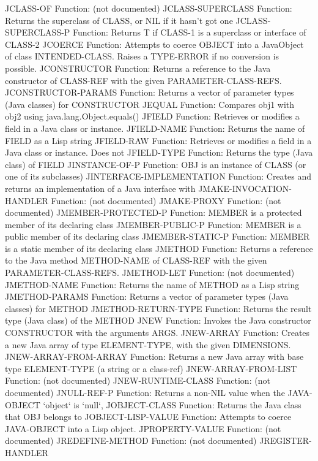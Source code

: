 JCLASS-OF
  Function: (not documented)
JCLASS-SUPERCLASS
  Function: Returns the superclass of CLASS, or NIL if it hasn't got one
JCLASS-SUPERCLASS-P
  Function: Returns T if CLASS-1 is a superclass or interface of CLASS-2
JCOERCE
  Function: Attempts to coerce OBJECT into a JavaObject of class INTENDED-CLASS.  Raises a TYPE-ERROR if no conversion is possible.
JCONSTRUCTOR
  Function: Returns a reference to the Java constructor of CLASS-REF with the given PARAMETER-CLASS-REFS.
JCONSTRUCTOR-PARAMS
  Function: Returns a vector of parameter types (Java classes) for CONSTRUCTOR
JEQUAL
  Function: Compares obj1 with obj2 using java.lang.Object.equals()
JFIELD
  Function: Retrieves or modifies a field in a Java class or instance.
JFIELD-NAME
  Function: Returns the name of FIELD as a Lisp string
JFIELD-RAW
  Function: Retrieves or modifies a field in a Java class or instance. Does not
JFIELD-TYPE
  Function: Returns the type (Java class) of FIELD
JINSTANCE-OF-P
  Function: OBJ is an instance of CLASS (or one of its subclasses)
JINTERFACE-IMPLEMENTATION
  Function: Creates and returns an implementation of a Java interface with
JMAKE-INVOCATION-HANDLER
  Function: (not documented)
JMAKE-PROXY
  Function: (not documented)
JMEMBER-PROTECTED-P
  Function: MEMBER is a protected member of its declaring class
JMEMBER-PUBLIC-P
  Function: MEMBER is a public member of its declaring class
JMEMBER-STATIC-P
  Function: MEMBER is a static member of its declaring class
JMETHOD
  Function: Returns a reference to the Java method METHOD-NAME of CLASS-REF with the given PARAMETER-CLASS-REFS.
JMETHOD-LET
  Function: (not documented)
JMETHOD-NAME
  Function: Returns the name of METHOD as a Lisp string
JMETHOD-PARAMS
  Function: Returns a vector of parameter types (Java classes) for METHOD
JMETHOD-RETURN-TYPE
  Function: Returns the result type (Java class) of the METHOD
JNEW
  Function: Invokes the Java constructor CONSTRUCTOR with the arguments ARGS.
JNEW-ARRAY
  Function: Creates a new Java array of type ELEMENT-TYPE, with the given DIMENSIONS.
JNEW-ARRAY-FROM-ARRAY
  Function: Returns a new Java array with base type ELEMENT-TYPE (a string or a class-ref)
JNEW-ARRAY-FROM-LIST
  Function: (not documented)
JNEW-RUNTIME-CLASS
  Function: (not documented)
JNULL-REF-P
  Function: Returns a non-NIL value when the JAVA-OBJECT `object` is `null`,
JOBJECT-CLASS
  Function: Returns the Java class that OBJ belongs to
JOBJECT-LISP-VALUE
  Function: Attempts to coerce JAVA-OBJECT into a Lisp object.
JPROPERTY-VALUE
  Function: (not documented)
JREDEFINE-METHOD
  Function: (not documented)
JREGISTER-HANDLER
